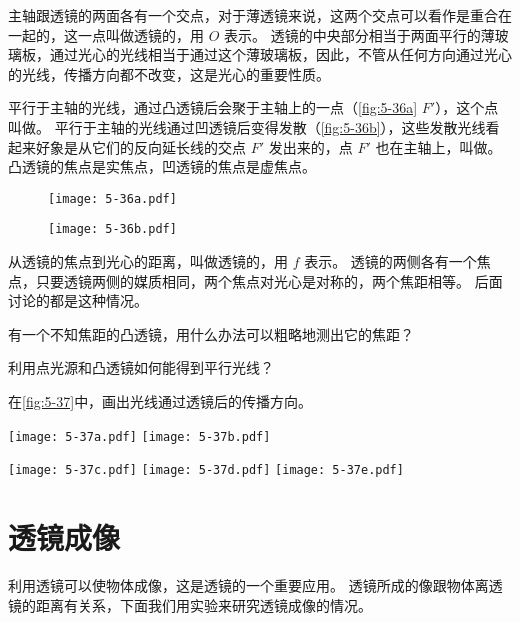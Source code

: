 主轴跟透镜的两面各有一个交点，对于薄透镜来说，这两个交点可以看作是重合在一起的，这一点叫做透镜的，用 $O$ 表示。
透镜的中央部分相当于两面平行的薄玻璃板，通过光心的光线相当于通过这个薄玻璃板，因此，不管从任何方向通过光心的光线，传播方向都不改变，这是光心的重要性质。

平行于主轴的光线，通过凸透镜后会聚于主轴上的一点（\cref{fig:5-36a} $F'$），这个点叫做。
平行于主轴的光线通过凹透镜后变得发散（\cref{fig:5-36b}），这些发散光线看起来好象是从它们的反向延长线的交点 $F'$ 发出来的，点 $F'$ 也在主轴上，叫做。
凸透镜的焦点是实焦点，凹透镜的焦点是虚焦点。
\begin{figure}
  \begin{minipage}[b]{0.48\linewidth}\centering
    \texttt{[image: 5-36a.pdf]}
    \subcaption{}\label{fig:5-36a}
  \end{minipage}
  \begin{minipage}[b]{0.48\linewidth}\centering
    \texttt{[image: 5-36b.pdf]}
    \subcaption{}\label{fig:5-36b}
  \end{minipage}
  \caption{}\label{fig:5-36}
\end{figure}

从透镜的焦点到光心的距离，叫做透镜的，用 $f$ 表示。
透镜的两侧各有一个焦点，只要透镜两侧的媒质相同，两个焦点对光心是对称的，两个焦距相等。
后面讨论的都是这种情况。

\begin{Practice}
  \begin{question}
    \item 有一个不知焦距的凸透镜，用什么办法可以粗略地测出它的焦距？
    \item 利用点光源和凸透镜如何能得到平行光线？
    \item 在\cref{fig:5-37}中，画出光线通过透镜后的传播方向。
    \begin{figurehere}
      \begin{minipage}{\linewidth}\centering
        \texttt{[image: 5-37a.pdf]}
        \texttt{[image: 5-37b.pdf]}
        
        \texttt{[image: 5-37c.pdf]}
        \texttt{[image: 5-37d.pdf]}
        \texttt{[image: 5-37e.pdf]}
        \caption{}\label{fig:5-37}
      \end{minipage}
    \end{figurehere}
  \end{question}
\end{Practice}

\section{透镜成像}
利用透镜可以使物体成像，这是透镜的一个重要应用。
透镜所成的像跟物体离透镜的距离有关系，下面我们用实验来研究透镜成像的情况。

